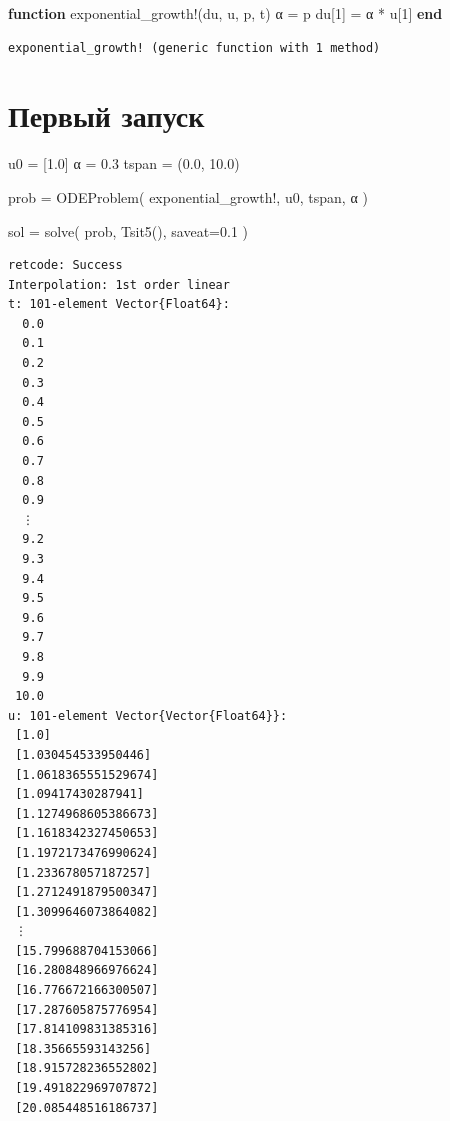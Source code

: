 \documentclass[
  russian,
  12pt,
  a4paper,
  DIV=11,
  numbers=noendperiod]{scrreprt}
\newenvironment{Shaded}{\begin{snugshade}}{\end{snugshade}}
\newcommand{\FloatTok}[1]{\textcolor[rgb]{0.68,0.00,0.00}{#1}}
\newcommand{\FunctionTok}[1]{\textcolor[rgb]{0.28,0.35,0.67}{#1}}
\newcommand{\KeywordTok}[1]{\textcolor[rgb]{0.00,0.23,0.31}{\textbf{#1}}}
\newcommand{\NormalTok}[1]{\textcolor[rgb]{0.00,0.23,0.31}{#1}}
\newcommand{\OperatorTok}[1]{\textcolor[rgb]{0.37,0.37,0.37}{#1}}
\begin{document}
\begin{Shaded}
\begin{Highlighting}[]
\KeywordTok{function} \FunctionTok{exponential\_growth!}\NormalTok{(du, u, p, t)}
\NormalTok{    α }\OperatorTok{=}\NormalTok{ p}
\NormalTok{    du[}\FloatTok{1}\NormalTok{] }\OperatorTok{=}\NormalTok{ α }\OperatorTok{*}\NormalTok{ u[}\FloatTok{1}\NormalTok{]}
\KeywordTok{end}
\end{Highlighting}
\end{Shaded}

\begin{verbatim}
exponential_growth! (generic function with 1 method)
\end{verbatim}

\section{Первый
запуск}\label{ux43fux435ux440ux432ux44bux439-ux437ux430ux43fux443ux441ux43a}

\begin{Shaded}
\begin{Highlighting}[]
\NormalTok{u0 }\OperatorTok{=}\NormalTok{ [}\FloatTok{1.0}\NormalTok{]}
\NormalTok{α }\OperatorTok{=} \FloatTok{0.3}
\NormalTok{tspan }\OperatorTok{=}\NormalTok{ (}\FloatTok{0.0}\NormalTok{, }\FloatTok{10.0}\NormalTok{)}

\NormalTok{prob }\OperatorTok{=} \FunctionTok{ODEProblem}\NormalTok{(}
\NormalTok{    exponential\_growth!,}
\NormalTok{    u0,}
\NormalTok{    tspan,}
\NormalTok{    α}
\NormalTok{)}

\NormalTok{sol }\OperatorTok{=} \FunctionTok{solve}\NormalTok{(}
\NormalTok{    prob,}
    \FunctionTok{Tsit5}\NormalTok{(),}
\NormalTok{    saveat}\OperatorTok{=}\FloatTok{0.1}
\NormalTok{)}
\end{Highlighting}
\end{Shaded}

\begin{verbatim}
retcode: Success
Interpolation: 1st order linear
t: 101-element Vector{Float64}:
  0.0
  0.1
  0.2
  0.3
  0.4
  0.5
  0.6
  0.7
  0.8
  0.9
  ⋮
  9.2
  9.3
  9.4
  9.5
  9.6
  9.7
  9.8
  9.9
 10.0
u: 101-element Vector{Vector{Float64}}:
 [1.0]
 [1.030454533950446]
 [1.0618365551529674]
 [1.09417430287941]
 [1.1274968605386673]
 [1.1618342327450653]
 [1.1972173476990624]
 [1.233678057187257]
 [1.2712491879500347]
 [1.3099646073864082]
 ⋮
 [15.799688704153066]
 [16.280848966976624]
 [16.776672166300507]
 [17.287605875776954]
 [17.814109831385316]
 [18.35665593143256]
 [18.915728236552802]
 [19.491822969707872]
 [20.085448516186737]
\end{verbatim}
\end{document}
